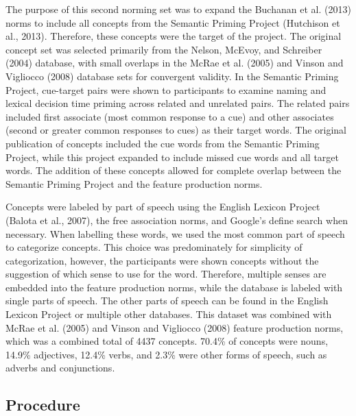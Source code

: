\documentclass[english,man]{apa6}
\theoremstyle{definition}
\theoremstyle{definition}
\theoremstyle{definition}
\theoremstyle{remark}
\begin{document}
The purpose of this second norming set was to expand the Buchanan et al.
(2013) norms to include all concepts from the Semantic Priming Project
(Hutchison et al., 2013). Therefore, these concepts were the target of
the project. The original concept set was selected primarily from the
Nelson, McEvoy, and Schreiber (2004) database, with small overlaps in
the McRae et al. (2005) and Vinson and Vigliocco (2008) database sets
for convergent validity. In the Semantic Priming Project, cue-target
pairs were shown to participants to examine naming and lexical decision
time priming across related and unrelated pairs. The related pairs
included first associate (most common response to a cue) and other
associates (second or greater common responses to cues) as their target
words. The original publication of concepts included the cue words from
the Semantic Priming Project, while this project expanded to include
missed cue words and all target words. The addition of these concepts
allowed for complete overlap between the Semantic Priming Project and
the feature production norms.

Concepts were labeled by part of speech using the English Lexicon
Project (Balota et al., 2007), the free association norms, and Google's
define search when necessary. When labelling these words, we used the
most common part of speech to categorize concepts. This choice was
predominately for simplicity of categorization, however, the
participants were shown concepts without the suggestion of which sense
to use for the word. Therefore, multiple senses are embedded into the
feature production norms, while the database is labeled with single
parts of speech. The other parts of speech can be found in the English
Lexicon Project or multiple other databases. This dataset was combined
with McRae et al. (2005) and Vinson and Vigliocco (2008) feature
production norms, which was a combined total of 4437 concepts. 70.4\% of
concepts were nouns, 14.9\% adjectives, 12.4\% verbs, and 2.3\% were
other forms of speech, such as adverbs and conjunctions.

\subsection{Procedure}\label{procedure}
\end{document}
